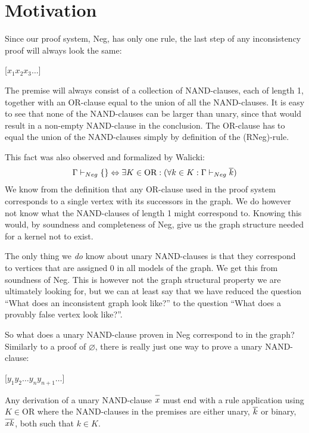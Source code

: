 \section{Motivation}
\label{sec:Motivation}
Since our proof system, Neg, has only one rule, the last step of any inconsistency proof will always look the same:
\begin{prooftree*}
  \Hypo{\dots}
  [$x_1x_2x_3\dots$]{\varnothing}
\end{prooftree*}
The premise will always consist of a collection of NAND-clauses, each of length 1, together with an OR-clause equal to the union of all the NAND-clauses.
It is easy to see that none of the NAND-clauses can be larger than unary, since that would result in a non-empty NAND-clause in the conclusion.
The OR-clause has to equal the union of the NAND-clauses simply by definition of the (RNeg)-rule.

This fact was also observed and formalized by Walicki\cite{michal-completeness}:
\begin{align}
  \Gamma \vdash_{Neg} \{\} \Leftrightarrow \exists K \in \text{OR}: (\forall  k \in K: \Gamma \vdash_{Neg} \ol{k})
\end{align}
We know from the definition that any OR-clause used in the proof system corresponds to a single vertex with its successors in the graph.
We do however not know what the NAND-clauses of length 1 might correspond to.
Knowing this would, by soundness and completeness of Neg, give us the graph structure needed for a kernel not to exist.

The only thing we \textit{do} know about unary NAND-clauses is that they correspond to vertices that are assigned 0 in all models of the graph.
We get this from soundness of Neg.
This is however not the graph structural property we are ultimately looking for, but we can at least say that we have reduced the question ``What does an inconsistent graph look like?'' to the question ``What does a provably false vertex look like?''.

So what does a unary NAND-clause proven in Neg correspond to in the graph?
Similarly to a proof of $\varnothing$, there is really just one way to prove a unary NAND-clause:
\begin{prooftree*}
  \Hypo{\dots}
  \Hypo{\dots}
  [$y_1y_2\dots y_ny_{n+1}\dots$]{}
\end{prooftree*}
Any derivation of a unary NAND-clause $\ol{x}$ must end with a rule application using $K \in \text{OR}$ where the NAND-clauses in the premises are either unary, $\ol{k}$ or binary, $\ol{xk}$, both such that $k \in K$.


